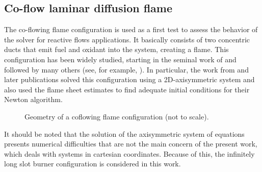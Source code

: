 
\subsection{Co-flow laminar diffusion flame}\label{ssec:coflowFlame}
The co-flowing flame configuration is used as a first test to assess the behavior of the solver for reactive flows applications. It basically consists of two concentric ducts that emit fuel and oxidant into the system, creating a flame. This configuration has been widely studied, starting in the seminal work of \cite{burkeDiffusionFlames1928} %
and followed by many others (see, for example, \cite{smookeNumericalModelingAxisymmetric1992, smookeNumericalSolutionTwoDimensional1986,braackAdaptiveFiniteElement1997}). In particular, the work from \cite{smookeNumericalModelingAxisymmetric1992} and later publications solved this configuration using a 2D-axisymmetric system and also used the flame sheet estimates to find adequate initial conditions for their Newton algorithm. 
\begin{figure}[t]
	\centering
	\def\svgwidth{0.38\textwidth}
	\qquad\quad
	\def\svgwidth{0.35\textwidth}
	\caption{Geometry of a coflowing flame configuration (not to scale).} \label{fig:CoFlowGeometry}
\end{figure}

It should be noted that the solution of the axisymmetric system of equations presents numerical difficulties that are not the main concern of the present work, which deals with systems in cartesian coordinates. Because of this, the infinitely long slot burner configuration is considered in this work.
